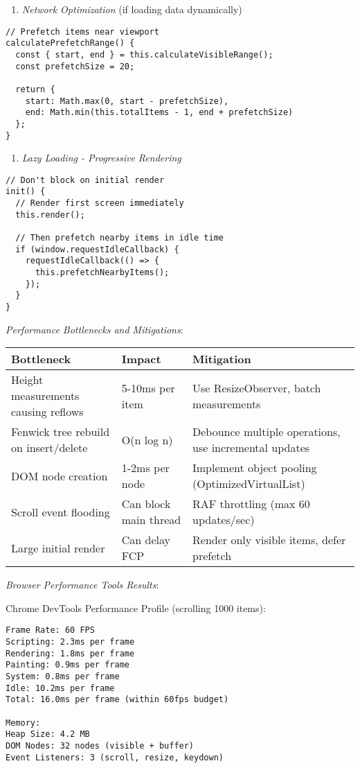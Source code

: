 \documentclass[11pt]{article}
\begin{document}
\begin{enumerate}
\item \emph{Network Optimization} (if loading data dynamically)
\end{enumerate}
\begin{verbatim}
// Prefetch items near viewport
calculatePrefetchRange() {
  const { start, end } = this.calculateVisibleRange();
  const prefetchSize = 20;
  
  return {
    start: Math.max(0, start - prefetchSize),
    end: Math.min(this.totalItems - 1, end + prefetchSize)
  };
}
\end{verbatim}

\begin{enumerate}
\item \emph{Lazy Loading - Progressive Rendering}
\end{enumerate}
\begin{verbatim}
// Don't block on initial render
init() {
  // Render first screen immediately
  this.render();
  
  // Then prefetch nearby items in idle time
  if (window.requestIdleCallback) {
    requestIdleCallback(() => {
      this.prefetchNearbyItems();
    });
  }
}
\end{verbatim}

\emph{Performance Bottlenecks and Mitigations}:

\begin{center}
\begin{tabular}{lll}
Bottleneck & Impact & Mitigation\\
\hline
Height measurements causing reflows & 5-10ms per item & Use ResizeObserver, batch measurements\\
Fenwick tree rebuild on insert/delete & O(n log n) & Debounce multiple operations, use incremental updates\\
DOM node creation & 1-2ms per node & Implement object pooling (OptimizedVirtualList)\\
Scroll event flooding & Can block main thread & RAF throttling (max 60 updates/sec)\\
Large initial render & Can delay FCP & Render only visible items, defer prefetch\\
\end{tabular}
\end{center}

\emph{Browser Performance Tools Results}:

Chrome DevTools Performance Profile (scrolling 1000 items):
\begin{verbatim}
Frame Rate: 60 FPS
Scripting: 2.3ms per frame
Rendering: 1.8ms per frame
Painting: 0.9ms per frame
System: 0.8ms per frame
Idle: 10.2ms per frame
Total: 16.0ms per frame (within 60fps budget)

Memory:
Heap Size: 4.2 MB
DOM Nodes: 32 nodes (visible + buffer)
Event Listeners: 3 (scroll, resize, keydown)
\end{verbatim}
\end{document}
